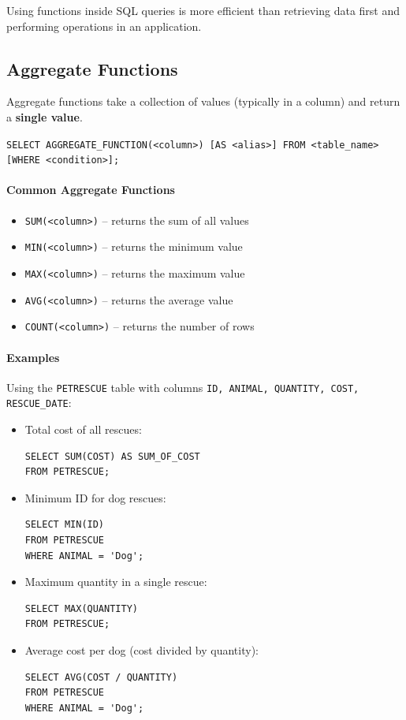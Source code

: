 \documentclass{article}
\begin{document}
Using functions inside SQL queries is more efficient than retrieving data first and performing operations in an application.

\subsection{Aggregate Functions}
Aggregate functions take a collection of values (typically in a column) and return a \textbf{single value}.  

\begin{FormulaBox}
\texttt{SELECT AGGREGATE\_FUNCTION(<column>) [AS <alias>] FROM <table\_name> [WHERE <condition>];}
\end{FormulaBox}

\paragraph{Common Aggregate Functions}
\begin{itemize}
    \item \texttt{SUM(<column>)} – returns the sum of all values
    \item \texttt{MIN(<column>)} – returns the minimum value
    \item \texttt{MAX(<column>)} – returns the maximum value
    \item \texttt{AVG(<column>)} – returns the average value
    \item \texttt{COUNT(<column>)} – returns the number of rows
\end{itemize}

\paragraph{Examples}  
Using the \texttt{PETRESCUE} table with columns \texttt{ID, ANIMAL, QUANTITY, COST, RESCUE\_DATE}:
\begin{itemize}
    \item Total cost of all rescues:
\begin{verbatim}
SELECT SUM(COST) AS SUM_OF_COST
FROM PETRESCUE;
\end{verbatim}

    \item Minimum ID for dog rescues:
\begin{verbatim}
SELECT MIN(ID)
FROM PETRESCUE
WHERE ANIMAL = 'Dog';
\end{verbatim}

    \item Maximum quantity in a single rescue:
\begin{verbatim}
SELECT MAX(QUANTITY)
FROM PETRESCUE;
\end{verbatim}

    \item Average cost per dog (cost divided by quantity):
\begin{verbatim}
SELECT AVG(COST / QUANTITY)
FROM PETRESCUE
WHERE ANIMAL = 'Dog';
\end{verbatim}
\end{itemize}
\end{document}
